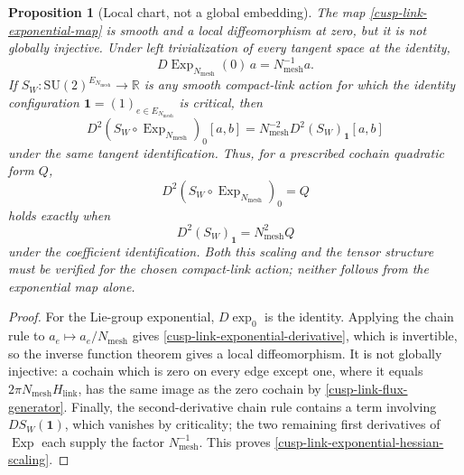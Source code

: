 \documentclass[11pt]{article}
\newtheorem{proposition}[theorem]{Proposition}
\theoremstyle{definition}
\numberwithin{equation}{section}
\begin{document}
\begin{proposition}[Local chart, not a global embedding]
\label{cusp-link-exponential-local-only}
The map \eqref{cusp-link-exponential-map} is smooth and a local
diffeomorphism at zero, but it is not globally injective.  Under left
trivialization of every tangent space at the identity,
\begin{equation}
 D\operatorname{Exp}_{N_{\mathrm{mesh}}}(0)\,a
 =N_{\mathrm{mesh}}^{-1}a.
 \label{cusp-link-exponential-derivative}
\end{equation}
If
\(S_W:\mathrm{SU}(2)^{E_{N_{\mathrm{mesh}}}}\to\mathbb R\) is any smooth
compact-link action for which the identity configuration
\(\mathbf1=(1)_{e\in E_{N_{\mathrm{mesh}}}}\) is critical, then
\begin{equation}
 D^2(S_W\circ\operatorname{Exp}_{N_{\mathrm{mesh}}})_0[a,b]
 =N_{\mathrm{mesh}}^{-2}
  D^2(S_W)_{\mathbf1}[a,b]
 \label{cusp-link-exponential-hessian-scaling}
\end{equation}
under the same tangent identification.  Thus, for a prescribed cochain
quadratic form \(Q\),
\[
 D^2(S_W\circ\operatorname{Exp}_{N_{\mathrm{mesh}}})_0=Q
\]
holds exactly when
\[
 D^2(S_W)_{\mathbf1}=N_{\mathrm{mesh}}^2Q
\]
under the coefficient identification.  Both this scaling and the tensor
structure must be verified for the chosen compact-link action; neither
follows from the exponential map alone.
\end{proposition}

\begin{proof}
For the Lie-group exponential, \(D\exp_0\) is the identity.  Applying the
chain rule to \(a_e\mapsto a_e/N_{\mathrm{mesh}}\) gives
\eqref{cusp-link-exponential-derivative}, which is invertible, so the inverse
function theorem gives a local diffeomorphism.  It is not globally
injective: a cochain which is zero on every edge except one, where it equals
\(2\pi N_{\mathrm{mesh}}H_{\mathrm{link}}\), has the same image as the zero cochain by
\eqref{cusp-link-flux-generator}.  Finally, the second-derivative chain rule
contains a term involving \(DS_W(\mathbf1)\), which vanishes by criticality;
the two remaining first derivatives of \(\operatorname{Exp}\) each supply
the factor \(N_{\mathrm{mesh}}^{-1}\).  This proves
\eqref{cusp-link-exponential-hessian-scaling}.
\end{proof}
\end{document}
